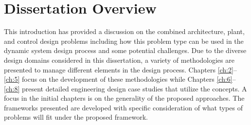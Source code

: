 \section{Dissertation Overview\label{sec:ch1:overview}}

This introduction has provided a discussion on the combined architecture, plant, and control design problems including how this problem type can be used in the dynamic system design process and some potential challenges.
Due to the diverse design domains considered in this dissertation, a variety of methodologies are presented to manage different elements in the design process.
Chapters \ref{ch:2}--\ref{ch:5} focus on the development of these methodologies while Chapters \ref{ch:6}--\ref{ch:8} present detailed engineering design case studies that utilize the concepts.
A focus in the initial chapters is on the generality of the proposed approaches.
The frameworks presented are developed with specific consideration of what types of problems will fit under the proposed framework.

